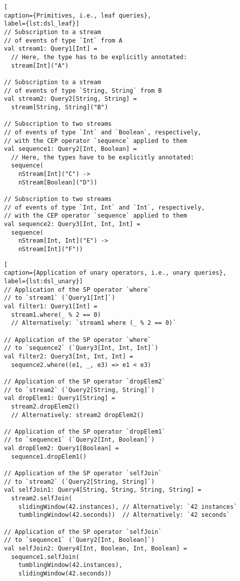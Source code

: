 \documentclass[article, type=bsc, colorback, accentcolor=tud8b, parskip=half, bibliography=totocnumbered]{tudthesis}
\begin{document}
\begin{lstlisting}[
caption={Primitives, i.e., leaf queries},
label={lst:dsl_leaf}]
// Subscription to a stream
// of events of type `Int` from A
val stream1: Query1[Int] =
  // Here, the type has to be explicitly annotated:
  stream[Int]("A")

// Subscription to a stream
// of events of type `String, String` from B
val stream2: Query2[String, String] =
  stream[String, String]("B")

// Subscription to two streams
// of events of type `Int` and `Boolean`, respectively,
// with the CEP operator `sequence` applied to them
val sequence1: Query2[Int, Boolean] =
  // Here, the types have to be explicitly annotated:
  sequence(
    nStream[Int]("C") ->
    nStream[Boolean]("D"))

// Subscription to two streams
// of events of type `Int, Int` and `Int`, respectively,
// with the CEP operator `sequence` applied to them
val sequence2: Query3[Int, Int, Int] =
  sequence(
    nStream[Int, Int]("E") ->
    nStream[Int]("F"))
\end{lstlisting}

\begin{lstlisting}[
caption={Application of unary operators, i.e., unary queries},
label={lst:dsl_unary}]
// Application of the SP operator `where`
// to `stream1` (`Query1[Int]`)
val filter1: Query1[Int] =
  stream1.where(_ % 2 == 0)
  // Alternatively: `stream1 where (_ % 2 == 0)`

// Application of the SP operator `where`
// to `sequence2` (`Query3[Int, Int, Int]`)
val filter2: Query3[Int, Int, Int] =
  sequence2.where((e1, _, e3) => e1 < e3)

// Application of the SP operator `dropElem2`
// to `stream2` (`Query2[String, String]`)
val dropElem1: Query1[String] =
  stream2.dropElem2()
  // Alternatively: stream2 dropElem2()

// Application of the SP operator `dropElem1`
// to `sequence1` (`Query2[Int, Boolean]`)
val dropElem2: Query1[Boolean] =
  sequence1.dropElem1()

// Application of the SP operator `selfJoin`
// to `stream2` (`Query2[String, String]`)
val selfJoin1: Query4[String, String, String, String] =
  stream2.selfJoin(
    slidingWindow(42.instances), // Alternatively: `42 instances`
    tumblingWindow(42.seconds))  // Alternatively: `42 seconds`

// Application of the SP operator `selfJoin`
// to `sequence1` (`Query2[Int, Boolean]`)
val selfJoin2: Query4[Int, Boolean, Int, Boolean] =
  sequence1.selfJoin(
    tumblingWindow(42.instances),
    slidingWindow(42.seconds))
\end{lstlisting}
\end{document}
